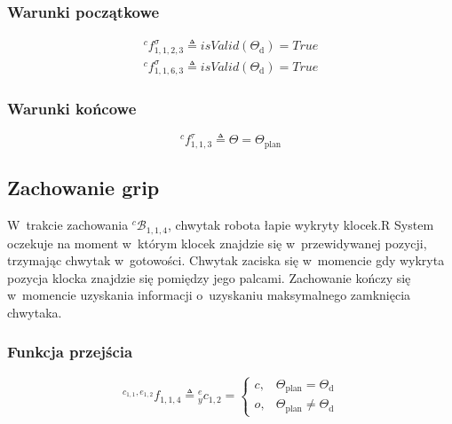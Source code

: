 \subsubsection{Warunki początkowe}
\begin{equation}
    \begin{gathered}
        {}^{c}f^{\sigma}_{1,1,2,3} \triangleq isValid(\Theta_{\mathrm{d}}) = True \\
        {}^{c}f^{\sigma}_{1,1,6,3} \triangleq isValid(\Theta_{\mathrm{d}}) = True        
    \end{gathered}
\end{equation}

\subsubsection{Warunki końcowe}
\begin{equation}
    {}^{c}f^{\tau}_{1,1,3} \triangleq \Theta = \Theta_{\mathrm{plan}}
\end{equation}



\subsection{Zachowanie grip}
\label{subsec:cs-grip}
W~trakcie zachowania ${}^{c}\mathcal{B}_{1,1,4}$, chwytak robota łapie wykryty klocek.R
System oczekuje na moment w~którym klocek znajdzie się w~przewidywanej pozycji, trzymając chwytak w~gotowości. Chwytak zaciska się w~momencie gdy wykryta pozycja klocka znajdzie się pomiędzy jego palcami. Zachowanie kończy się w~momencie uzyskania informacji o~uzyskaniu maksymalnego zamknięcia chwytaka.

\subsubsection{Funkcja przejścia}
\begin{equation}
    {}^{c_{1,1}, e_{1,2}}f_{1,1,4} \triangleq {}^{e}_{y}c_{1,2} = \begin{cases}
        c, & \Theta_{\mathrm{plan}} = \Theta_{\mathrm{d}}\\
        o, & \Theta_{\mathrm{plan}} \neq \Theta_{\mathrm{d}}
    \end{cases}
\end{equation}

